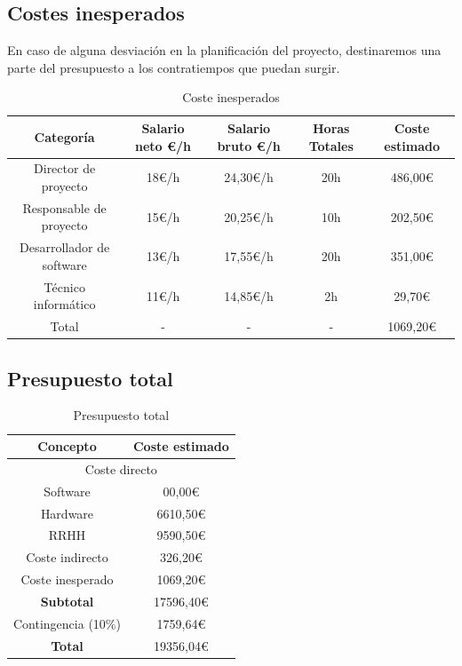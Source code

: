 \documentclass[titlepage,12pt]{report}
\begin{document}
\subsection{Costes inesperados}

En caso de alguna desviación en la planificación del proyecto, destinaremos una parte del presupuesto a los contratiempos que puedan surgir.

\begin{table}[H]
	\centering
	\begin{tabular}{|c|c|c|c|c|}
		\hline
		\textbf{Categoría} & \textbf{Salario neto €/h} & \textbf{Salario bruto €/h} & \textbf{Horas Totales} & \textbf{Coste estimado} \\ \hline \hline
		Director de proyecto 	  & 18€/h & 24,30€/h & 20h  &  486,00€  \\ \hline
		Responsable de proyecto   & 15€/h & 20,25€/h & 10h  &  202,50€  \\ \hline
		Desarrollador de software & 13€/h & 17,55€/h & 20h  &  351,00€  \\ \hline
		Técnico informático 	  & 11€/h & 14,85€/h &  2h  &   29,70€  \\ \hline \hline			
		Total 					  & - 	  & - 		 & -    & 1069,20€  \\ \hline
	\end{tabular}
	\caption{Coste inesperados}
	\label{rrhh_2}
\end{table}

\subsection{Presupuesto total}

\begin{table}[H]
	\centering
	\begin{tabular}{|c|c|}
		\hline
		\textbf{Concepto} 		& \textbf{Coste estimado} \\ \hline \hline
		\multicolumn{2}{|c|}{Coste directo}  \\ \hline
		Software 				&    00,00€  \\
		Hardware				&  6610,50€  \\ 
		RRHH 					&  9590,50€  \\ \hline 
		Coste indirecto			&   326,20€  \\ \hline
		Coste inesperado		&  1069,20€	 \\ \hline		
		\textbf{Subtotal}		& 17596,40€  \\ \hline
		Contingencia (10$\%$) 	&  1759,64€  \\ \hline \hline
		\textbf{Total}			& 19356,04€  \\ \hline
	\end{tabular}
	\caption{Presupuesto total}
	\label{total}
\end{table}
\end{document}
